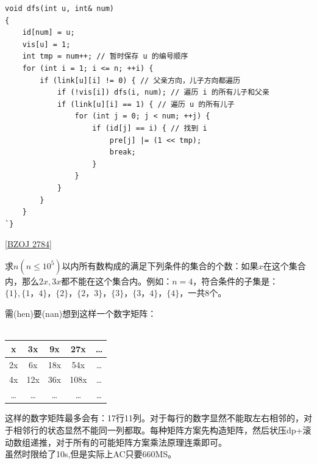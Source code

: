 \begin{lstlisting}
void dfs(int u, int& num)
{
	id[num] = u;
	vis[u] = 1;
	int tmp = num++; // 暂时保存 u 的编号顺序
	for (int i = 1; i <= n; ++i) {
		if (link[u][i] != 0) { // 父亲方向，儿子方向都遍历
			if (!vis[i]) dfs(i, num); // 遍历 i 的所有儿子和父亲
			if (link[u][i] == 1) { // 遍历 u 的所有儿子
				for (int j = 0; j < num; ++j) {
					if (id[j] == i) { // 找到 i
						pre[j] |= (1 << tmp);
						break;
					}
				}
			}
		}
	}
`}
\end{lstlisting}

\underline {[BZOJ 2784]}

求$n(n\leq 10^5)$以内所有数构成的满足下列条件的集合的个数：如果$x$在这个集合内，那么$2x,3x$都不能在这个集合内。例如：$n=4$，符合条件的子集是：$\{1\},\{1，4\}，\{2\}，\{2，3\}，\{3\}，\{3，4\}，\{4\}$，一共8个。

需(hen)要(nan)想到这样一个数字矩阵： \\ \\
\begin{tabular}{|c|c|c|c|c|}%
\hline %
x  &  3x &  9x  & 27x  & \dots \\
\hline
2x &  6x & 18x  & 54x  & \dots \\
\hline
4x & 12x & 36x  & 108x & \dots \\
\hline
\dots & \dots & \dots & \dots & \dots \\
\hline
\end{tabular}

这样的数字矩阵最多会有：17行11列。对于每行的数字显然不能取左右相邻的，对于相邻行的状态显然不能同一列都取。每种矩阵方案先构造矩阵，然后状压dp+滚动数组递推，对于所有的可能矩阵方案乘法原理连乘即可。 \\
虽然时限给了10s,但是实际上AC只要660MS。

